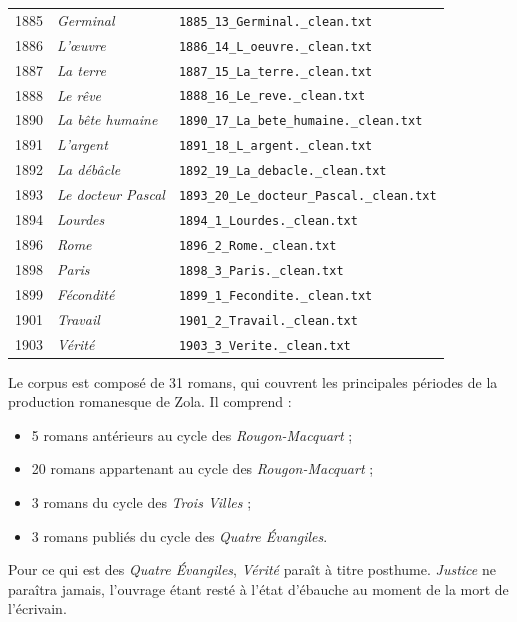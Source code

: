 \begin{longtable}{p{1.6cm}p{4.2cm}p{8cm}}
1885 & \textit{Germinal} & \texttt{1885\_13\_Germinal.\_clean.txt} \\
1886 & \textit{L'œuvre} & \texttt{1886\_14\_L\_oeuvre.\_clean.txt} \\
1887 & \textit{La terre} & \texttt{1887\_15\_La\_terre.\_clean.txt} \\
1888 & \textit{Le rêve} & \texttt{1888\_16\_Le\_reve.\_clean.txt} \\
1890 & \textit{La bête humaine} & \texttt{1890\_17\_La\_bete\_humaine.\_clean.txt} \\
1891 & \textit{L'argent} & \texttt{1891\_18\_L\_argent.\_clean.txt} \\
1892 & \textit{La débâcle} & \texttt{1892\_19\_La\_debacle.\_clean.txt} \\
1893 & \textit{Le docteur Pascal} & \texttt{1893\_20\_Le\_docteur\_Pascal.\_clean.txt} \\
1894 & \textit{Lourdes} & \texttt{1894\_1\_Lourdes.\_clean.txt} \\
1896 & \textit{Rome} & \texttt{1896\_2\_Rome.\_clean.txt} \\
1898 & \textit{Paris} & \texttt{1898\_3\_Paris.\_clean.txt} \\
1899 & \textit{Fécondité} & \texttt{1899\_1\_Fecondite.\_clean.txt} \\
1901 & \textit{Travail} & \texttt{1901\_2\_Travail.\_clean.txt} \\
1903 & \textit{Vérité} & \texttt{1903\_3\_Verite.\_clean.txt} \\

\bottomrule
\end{longtable}

Le corpus est composé de 31 romans, qui couvrent les principales périodes de la production romanesque de Zola. Il comprend :

\begin{itemize}
    \item 5 romans antérieurs au cycle des \textit{Rougon-Macquart} ;
    \item 20 romans appartenant au cycle des \textit{Rougon-Macquart} ;
    \item 3 romans du cycle des \textit{Trois Villes} ;
    \item 3 romans publiés du cycle des \textit{Quatre Évangiles}.
\end{itemize}

Pour ce qui est des \textit{Quatre Évangiles}, \textit{Vérité} paraît à titre posthume. \textit{Justice} ne paraîtra jamais, l'ouvrage étant resté à l'état d'ébauche au moment de la mort de l'écrivain.

